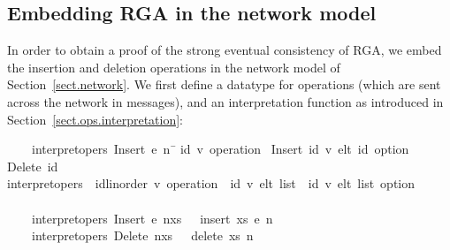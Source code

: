 \subsection{Embedding RGA in the network model}

In order to obtain a proof of the strong eventual consistency of RGA, we embed the insertion and deletion operations in the network model of Section~\ref{sect.network}.
We first define a datatype for operations (which are sent across the network in messages), and an interpretation function as introduced in Section~\ref{sect.ops.interpretation}:
\begin{isabelle}
~~~~{\isachardoublequoteopen}interpret{\isacharunderscore}opers\ {\isacharparenleft}Insert\ e\ n{\isacharparenright}\ \=\kill
{} {\isacharparenleft}{\isacharprime}id{\isacharcomma}\ {\isacharprime}v{\isacharparenright}\ operation\ {\isacharequal} Insert\ {\isachardoublequoteopen}{\isacharparenleft}{\isacharprime}id{\isacharcomma}\ {\isacharprime}v{\isacharparenright}\ elt{\isachardoublequoteclose}\ {\isachardoublequoteopen}{\isacharprime}id\ option{\isachardoublequoteclose}\ {\isacharbar} Delete\ {\isachardoublequoteopen}{\isacharprime}id{\isachardoublequoteclose}\\[4pt]
 interpret{\isacharunderscore}opers\ {\isacharcolon}{\isacharcolon}\ {\isachardoublequoteopen}{\isacharparenleft}{\isacharprime}id{\isacharcolon}{\isacharcolon}linorder{\isacharcomma}\ {\isacharprime}v{\isacharparenright}\ operation\ {\isasymRightarrow}\ {\isacharparenleft}{\isacharprime}id{\isacharcomma}\ {\isacharprime}v{\isacharparenright}\ elt\ list\ {\isasymRightarrow}\ {\isacharparenleft}{\isacharprime}id{\isacharcomma}\ {\isacharprime}v{\isacharparenright}\ elt\ list\ option{\isachardoublequoteclose}\\
\\
~~~~{\isachardoublequoteopen}interpret{\isacharunderscore}opers\ {\isacharparenleft}Insert\ e\ n{\isacharparenright}\>xs\ \ {\isacharequal}\ insert\ xs\ e\ n{\isachardoublequoteclose}\ {\isacharbar}\\
~~~~{\isachardoublequoteopen}interpret{\isacharunderscore}opers\ {\isacharparenleft}Delete\ n{\isacharparenright}\>xs\ \ {\isacharequal}\ delete\ xs\ n{\isachardoublequoteclose}
\end{isabelle}


